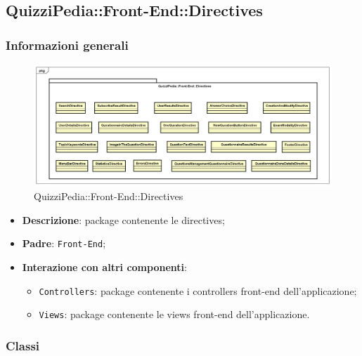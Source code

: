 \newpage

\subsection{QuizziPedia::Front-End::Directives}
\subsubsection{Informazioni generali}
\label{QuizziPedia::Front-End::Directives}
\begin{figure}
	\centering
	\includegraphics[scale=0.45]{UML/Package/QuizziPedia_Front-End_Directives.png}
	\caption{QuizziPedia::Front-End::Directives}
\end{figure}
\begin{itemize}
	\item \textbf{Descrizione}: package contenente le directives;
	\item \textbf{Padre}: \texttt{Front-End};
	\item \textbf{Interazione con altri componenti}:
	\begin{itemize}
		\item \texttt{Controllers}: package contenente i controllers front-end dell'applicazione;
		\item \texttt{Views}: package contenente le views front-end dell'applicazione.
	\end{itemize}
\end{itemize}
\subsubsection{Classi}


